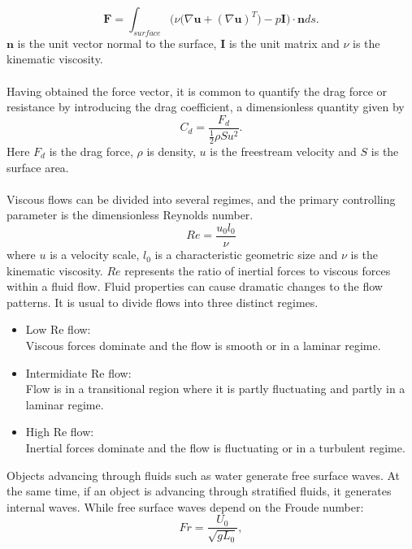 \documentclass[a4paper, 12pt]{report}
\begin{document}
\begin{equation}
\mathbf{F} = \int_{surface} \Big(\nu\big(\nabla \mathbf{u} + (\nabla \mathbf{u})^T\big) - p \mathbf{I}\Big) \cdot \mathbf{n} ds.
\label{eqn:forceVector}
\end{equation}
$\mathbf{n}$ is the unit vector normal to the surface, $\mathbf {I}$ is the unit matrix and $\nu$ is the kinematic viscosity. \\
\\
Having obtained the force vector, it is common to quantify the drag force or resistance by introducing the drag coefficient, a dimensionless quantity given by
\begin{equation}
C_d = \frac{F_d}{\frac{1}{2}\rho S u^2}.
\label{eqn:dragCoeff}
\end{equation}
Here $F_d$ is the drag force, $\rho$ is density, $u$ is the freestream velocity and $S$ is the surface area. \\
\\
Viscous flows can be divided into several regimes, and the primary controlling parameter is the dimensionless Reynolds number\cite{White}.
\begin{equation}
Re = \frac{u_0l_0}{\nu}
\label{eqn:ReynoldsNumber}
\end{equation}
where $u$ is a velocity scale, $l_0$ is a characteristic geometric size and $\nu$ is the kinematic viscosity. $Re$ represents the ratio of inertial forces to viscous forces within a fluid flow. Fluid properties can cause dramatic changes to the flow patterns. It is usual to divide flows into three distinct regimes.
\begin{itemize}
	\item Low Re flow: \\ Viscous forces dominate and the flow is smooth or in a laminar regime.
	\item Intermidiate Re flow: \\ Flow is in a transitional region where it is partly fluctuating and partly in a laminar regime.
	\item High Re flow: \\ Inertial forces dominate and the flow is fluctuating or in a turbulent regime.
\end{itemize} 
Objects advancing through fluids such as water generate free surface waves. At the same time, if an object is advancing through stratified fluids, it generates internal waves. While free surface waves depend on the Froude number: 
\begin{equation}
Fr = \frac{U_0}{\sqrt{gL_0}},
\label{eqn:FroudeNumber}
\end{equation} 
\end{document}

